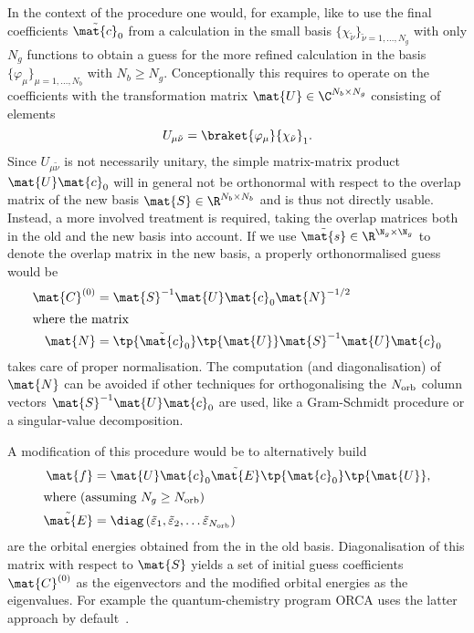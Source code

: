 In the context of the \SCF procedure one would, for example,
like to use the final coefficients $\tilde{\mat{c}}_0$ from a calculation
in the small basis $\{\chi_{\tilde{\nu}}\}_{\tilde{\nu}=1,\ldots,N_g}$
with only $N_g$ functions
to obtain a guess for the more refined calculation in the basis
$\{\varphi_\mu\}_{\mu=1,\ldots,N_b}$ with $N_b \geq N_g$.
Conceptionally this requires to operate on the coefficients
with the transformation matrix
$\mat{U} \in \C^{N_b\times N_g}$
consisting of elements
\[ U_{\mu\tilde{\nu}} = \braket{\varphi_\mu}{\chi_{\tilde{\nu}}}_1. \]
Since $U_{\mu\tilde{\nu}}$ is not necessarily unitary,
the simple matrix-matrix product $\mat{U} \mat{c}_0$
will in general not be orthonormal
with respect to the overlap matrix of the new basis $\mat{S} \in \R^{N_b \times N_b}$
and is thus not directly usable.
Instead, a more involved treatment is required,
taking the overlap matrices both in the old and the new basis into account.
If we use $\tilde{\mat{s}} \in \R^{\N_g \times \N_g}$
to denote the overlap matrix in the new basis,
a properly orthonormalised guess would be~\cite{Polly2004}
\begin{align}
	\mat{C}^{(0)} &= \mat{S}^{-1} \mat{U} \mat{c}_0 \mat{N}^{-1/2} \\
	\intertext{where the matrix}
	\mat{N} &= \tp{\tilde{\mat{c}}_0} \tp{\mat{U}} \mat{S}^{-1} \mat{U} \mat{c}_0
\end{align}
takes care of proper normalisation.
The computation (and diagonalisation) of $\mat{N}$
can be avoided if other techniques
for orthogonalising the $N_\text{orb}$ column vectors $\mat{S}^{-1} \mat{U} \mat{c}_0$
are used, like a Gram-Schmidt procedure or a singular-value decomposition.

A modification of this procedure would be to alternatively build
\begin{align}
	\label{eqn:GuessMatF}
	\mat{f} &= \mat{U} \mat{c}_0 \tilde{\mat{E}} \tp{\mat{c}_0} \tp{\mat{U}}, \\
	\intertext{where (assuming $N_g \geq \Norb$)}
	\nonumber
	\tilde{\mat{E}} &= \diag\left(\tilde{\varepsilon}_1, \tilde{\varepsilon}_2,
			\ldots \tilde{\varepsilon}_{\Norb}\right)
\end{align}
are the orbital energies obtained from the \SCF in the old basis.
Diagonalisation of this matrix with respect to $\mat{S}$
yields a set of initial guess coefficients $\mat{C}^{(0)}$ as the eigenvectors
and the modified orbital energies as the eigenvalues.
For example the quantum-chemistry program ORCA uses the latter
approach by default~\cite{ORCA}.

